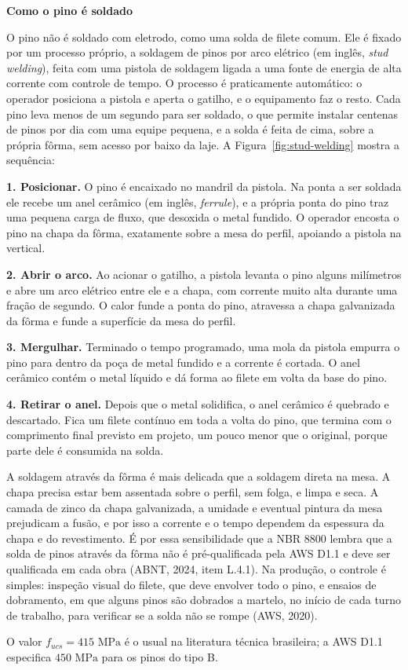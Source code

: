 \documentclass[11pt,a4paper]{article}
\newcommand{\caixaconceito}[2]{%
  \par\vspace{6pt}\noindent\colorbox{calloutbg}{%
    \parbox{\dimexpr\linewidth-2\fboxsep\relax}{%
      \vspace{4pt}\textbf{\color{primary}#1}\par\vspace{3pt}#2\vspace{4pt}%
    }%
  }\par\vspace{6pt}%
}
\begin{document}
\caixaconceito{Como o pino é soldado}{%
O pino não é soldado com eletrodo, como uma solda de filete comum. Ele é fixado por um processo próprio, a soldagem de pinos por arco elétrico (em inglês, \textit{stud welding}), feita com uma pistola de soldagem ligada a uma fonte de energia de alta corrente com controle de tempo. O processo é praticamente automático: o operador posiciona a pistola e aperta o gatilho, e o equipamento faz o resto. Cada pino leva menos de um segundo para ser soldado, o que permite instalar centenas de pinos por dia com uma equipe pequena, e a solda é feita de cima, sobre a própria fôrma, sem acesso por baixo da laje. A Figura~\ref{fig:stud-welding} mostra a sequência:\par\vspace{4pt}
\textbf{1. Posicionar.} O pino é encaixado no mandril da pistola. Na ponta a ser soldada ele recebe um anel cerâmico (em inglês, \textit{ferrule}), e a própria ponta do pino traz uma pequena carga de fluxo, que desoxida o metal fundido. O operador encosta o pino na chapa da fôrma, exatamente sobre a mesa do perfil, apoiando a pistola na vertical.\par
\textbf{2. Abrir o arco.} Ao acionar o gatilho, a pistola levanta o pino alguns milímetros e abre um arco elétrico entre ele e a chapa, com corrente muito alta durante uma fração de segundo. O calor funde a ponta do pino, atravessa a chapa galvanizada da fôrma e funde a superfície da mesa do perfil.\par
\textbf{3. Mergulhar.} Terminado o tempo programado, uma mola da pistola empurra o pino para dentro da poça de metal fundido e a corrente é cortada. O anel cerâmico contém o metal líquido e dá forma ao filete em volta da base do pino.\par
\textbf{4. Retirar o anel.} Depois que o metal solidifica, o anel cerâmico é quebrado e descartado. Fica um filete contínuo em toda a volta do pino, que termina com o comprimento final previsto em projeto, um pouco menor que o original, porque parte dele é consumida na solda.\par\vspace{4pt}
A soldagem através da fôrma é mais delicada que a soldagem direta na mesa. A chapa precisa estar bem assentada sobre o perfil, sem folga, e limpa e seca. A camada de zinco da chapa galvanizada, a umidade e eventual pintura da mesa prejudicam a fusão, e por isso a corrente e o tempo dependem da espessura da chapa e do revestimento. É por essa sensibilidade que a NBR 8800 lembra que a solda de pinos através da fôrma não é pré-qualificada pela AWS D1.1 e deve ser qualificada em cada obra (ABNT, 2024, item L.4.1). Na produção, o controle é simples: inspeção visual do filete, que deve envolver todo o pino, e ensaios de dobramento, em que alguns pinos são dobrados a martelo, no início de cada turno de trabalho, para verificar se a solda não se rompe (AWS, 2020).\par\vspace{4pt}
O valor $f_{ucs} = 415\text{ MPa}$ é o usual na literatura técnica brasileira; a AWS D1.1 especifica $450\text{ MPa}$ para os pinos do tipo B.}
\end{document}
